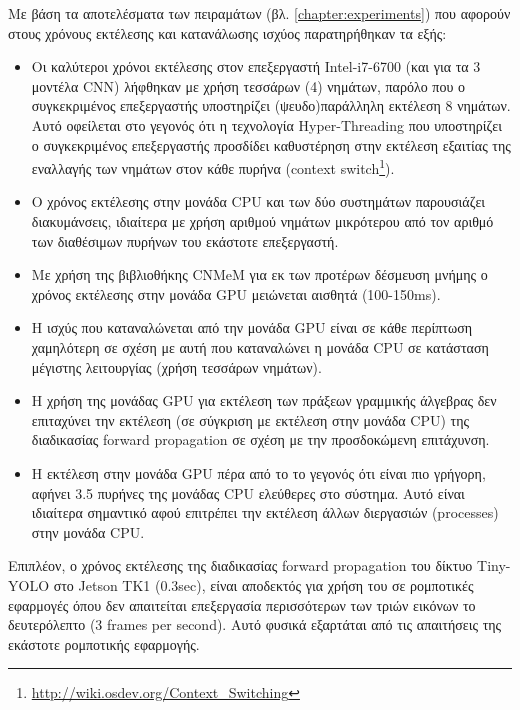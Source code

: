 Με βάση τα αποτελέσματα των πειραμάτων (βλ. \autoref{chapter:experiments})
που αφορούν στους χρόνους εκτέλεσης και κατανάλωσης ισχύος παρατηρήθηκαν τα
εξής:
\begin{itemize}
  \item{Οι καλύτεροι χρόνοι εκτέλεσης στον επεξεργαστή Intel-i7-6700 (και για τα 3 μοντέλα CNN)
      λήφθηκαν με χρήση τεσσάρων (4) νημάτων, παρόλο που ο συγκεκριμένος επεξεργαστής υποστηρίζει
      (ψευδο)παράλληλη εκτέλεση 8 νημάτων. Αυτό οφείλεται στο γεγονός ότι
      η τεχνολογία Hyper-Threading που υποστηρίζει ο συγκεκριμένος επεξεργαστής
      προσδίδει καθυστέρηση στην εκτέλεση εξαιτίας της εναλλαγής των
      νημάτων στον κάθε πυρήνα
      (context switch\footnote{\url{http://wiki.osdev.org/Context_Switching}}).
    }
  \item{Ο χρόνος εκτέλεσης στην μονάδα CPU και των δύο συστημάτων παρουσιάζει διακυμάνσεις,
      ιδιαίτερα με χρήση αριθμού νημάτων μικρότερου από τον αριθμό
      των διαθέσιμων πυρήνων του εκάστοτε επεξεργαστή.}
  \item{
      Με χρήση της βιβλιοθήκης CNMeM για εκ των προτέρων δέσμευση μνήμης
      ο χρόνος εκτέλεσης στην μονάδα GPU μειώνεται αισθητά (100-150ms).
    }
  \item{
      Η ισχύς που καταναλώνεται από την μονάδα GPU είναι σε κάθε περίπτωση χαμηλότερη σε σχέση
      με αυτή που καταναλώνει η μονάδα CPU σε κατάσταση μέγιστης
      λειτουργίας (χρήση τεσσάρων νημάτων).
    }
  \item{
      Η χρήση της μονάδας GPU για εκτέλεση των πράξεων γραμμικής άλγεβρας δεν
      επιταχύνει την εκτέλεση (σε σύγκριση με εκτέλεση στην μονάδα CPU) της
      διαδικασίας forward propagation σε σχέση με την προσδοκώμενη επιτάχυνση.
    }
  \item{
      Η εκτέλεση στην μονάδα GPU πέρα από το το γεγονός ότι είναι πιο γρήγορη,
      αφήνει 3.5 πυρήνες της μονάδας CPU ελεύθερες στο σύστημα.
      Αυτό είναι ιδιαίτερα σημαντικό αφού επιτρέπει την εκτέλεση άλλων
      διεργασιών (processes) στην μονάδα CPU.
    }
\end{itemize}

Επιπλέον, ο χρόνος εκτέλεσης της διαδικασίας forward propagation του
δίκτυο Tiny-YOLO στο Jetson TK1 (0.3sec), είναι αποδεκτός
για χρήση του σε ρομποτικές εφαρμογές όπου δεν απαιτείται επεξεργασία
περισσότερων των τριών εικόνων το δευτερόλεπτο (3 frames per second). Αυτό
φυσικά εξαρτάται από τις απαιτήσεις της εκάστοτε ρομποτικής εφαρμογής.



